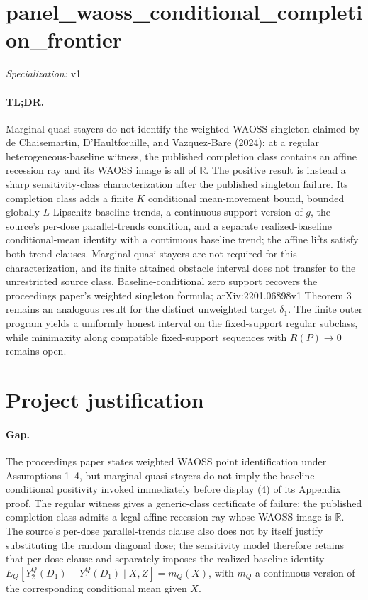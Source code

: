 \documentclass{article}
\begin{document}
\sloppy

\section*{panel\_\allowbreak{}waoss\_\allowbreak{}conditional\_\allowbreak{}completion\_\allowbreak{}frontier}

\noindent\textit{Specialization:} v1\par

\paragraph{TL;DR.} Marginal quasi-stayers do not identify the weighted WAOSS singleton claimed by de Chaisemartin, D'Haultf\oe{}uille, and Vazquez-Bare (2024): at a regular heterogeneous-baseline witness, the published completion class contains an affine recession ray and its WAOSS image is all of \(\mathbb R\). The positive result is instead a sharp sensitivity-class characterization after the published singleton failure. Its completion class adds a finite \(K\) conditional mean-movement bound, bounded globally \(L\)-Lipschitz baseline trends, a continuous support version of \(g\), the source's per-dose parallel-trends condition, and a separate realized-baseline conditional-mean identity with a continuous baseline trend; the affine lifts satisfy both trend clauses. Marginal quasi-stayers are not required for this characterization, and its finite attained obstacle interval does not transfer to the unrestricted source class. Baseline-conditional zero support recovers the proceedings paper's weighted singleton formula; arXiv:2201.06898v1 Theorem 3 remains an analogous result for the distinct unweighted target \(\delta_1\). The finite outer program yields a uniformly honest interval on the fixed-support regular subclass, while minimaxity along compatible fixed-support sequences with \(R(P)\to0\) remains open.

\section{Project justification}

\paragraph{Gap.} The proceedings paper states weighted WAOSS point identification under Assumptions 1--4, but marginal quasi-stayers do not imply the baseline-conditional positivity invoked immediately before display (4) of its Appendix proof. The regular witness gives a generic-class certificate of failure: the published completion class admits a legal affine recession ray whose WAOSS image is \(\mathbb R\). The source's per-dose parallel-trends clause also does not by itself justify substituting the random diagonal dose; the sensitivity model therefore retains that per-dose clause and separately imposes the realized-baseline identity \(E_Q[Y_2^Q(D_1)-Y_1^Q(D_1)\mid X,Z]=m_Q(X)\), with \(m_Q\) a continuous version of the corresponding conditional mean given \(X\).
\end{document}
